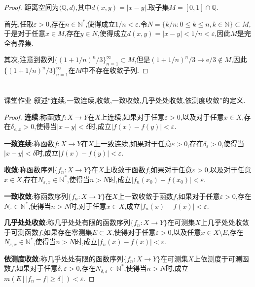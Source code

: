 \documentclass[lang = cn, scheme = chinese]{elegantbook}
\begin{document}
	\begin{proof}
		距离空间为$\langle \mathbb{Q},d \rangle$,其中$d(x,y)=|x-y|$.取子集$M=[0,1]\cap \mathbb{Q}$.
		
		首先,任取$\varepsilon>0$,存在$n\in\mathbb{N}^*$,使得成立$1/n<\varepsilon$.令$N=\{ k/n:0\le k \le n,k\in\mathbb{N} \}\subset M$,于是对于任意$x\in M$,存在$y\in N$,使得成立$d(x,y)=|x-y|<1/n<\varepsilon$,因此$M$是完全有界集.
		
		其次,注意到数列$\{ (1+1/n)^n/3 \}_{n=1}^{\infty}\subset M$,但是$(1+1/n)^n/3\to \mathrm{e}/3\notin M$,因此$\{ (1+1/n)^n/3 \}_{n=1}^{\infty}$在$M$中不存在收敛子列.
	\end{proof}
	
	\chapter{}
	
	\begin{proposition}{课堂作业}
		叙述“连续,一致连续,收敛,一致收敛,几乎处处收敛,依测度收敛”的定义.
	\end{proposition}
	
	\begin{proof}
		{\bf 连续}:称函数$f:X\to Y$在$X$上连续,如果对于任意$\varepsilon>0$,以及对于任意$x\in X$,存在$\delta_{\varepsilon,x}>0$,使得当$|x-y|<\delta$时,成立$|f(x)-f(y)|<\varepsilon$.
		
		{\bf 一致连续}:称函数$f:X\to Y$在$X$上一致连续,如果对于任意$\varepsilon>0$,存在$\delta_\varepsilon>0$,使得当$|x-y|<\delta$时,成立$|f(x)-f(y)|<\varepsilon$.
		
		{\bf 收敛}:称函数序列$\{f_n:X\to Y\}$在$X$上收敛于函数$f$,如果对于任意$\varepsilon>0$,以及对于任意$x\in X$,存在$N_{\varepsilon,x}\in\mathbb{N}^*$,使得当$n>N$时,成立$|f_n(x_0)-f(x_0)|<\varepsilon$.
		
		{\bf 一致收敛}:称函数序列$\{f_n:X\to Y\}$在$X$上一致收敛于函数$f$,如果对于任意$\varepsilon>0$,存在$N_\varepsilon\in\mathbb{N}^*$,使得当$n>N$时,对于任意$x\in X$,成立$|f_n(x)-f(x)|<\varepsilon$.
		
		{\bf 几乎处处收敛}:称几乎处处有限的函数序列$\{f_n:X\to Y\}$在可测集$X$上几乎处处收敛于可测函数$f$,如果存在零测集$E\subset X$,使得对于任意$\varepsilon>0$,以及任意$x\in X\setminus E$,存在$N_{\varepsilon,x}\in\mathbb{N}^*$,使得当$n>N$时,成立$|f_n(x)-f(x)|<\varepsilon$.
		
		{\bf 依测度收敛}:称几乎处处有限的函数序列$\{f_n:X\to Y\}$在可测集$X$上依测度于可测函数$f$,如果对于任意$\delta,\varepsilon>0$,存在$N_{\delta,\varepsilon}\in\mathbb{N}^*$,使得当$n>N$时,成立$m(E[|f_n-f|\ge\delta])<\varepsilon$.
	\end{proof}
	
\end{document}
